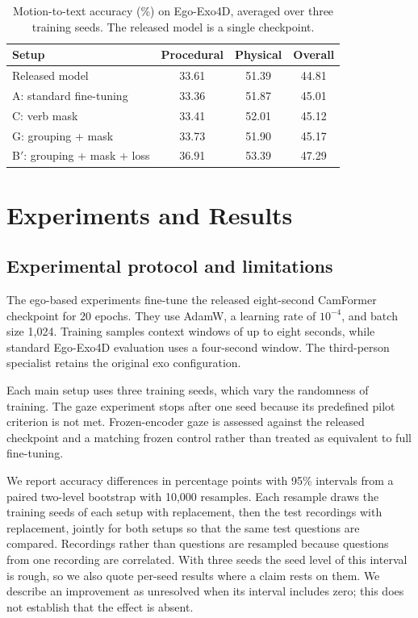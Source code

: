 \documentclass[10pt,twocolumn,letterpaper]{article}
\begin{document}
\begin{table}[t]
\centering\small
\setlength{\tabcolsep}{3pt}
\begin{tabular}{lccc}
\toprule
Setup & Procedural & Physical & Overall \\
\midrule
Released model & 33.61 & 51.39 & 44.81 \\
A: standard fine-tuning & 33.36 & 51.87 & 45.01 \\
C: verb mask & 33.41 & 52.01 & 45.12 \\
G: grouping + mask & 33.73 & 51.90 & 45.17 \\
B$'$: grouping + mask + loss & 36.91 & 53.39 & 47.29 \\
\bottomrule
\end{tabular}
\caption{Motion-to-text accuracy (\%) on Ego-Exo4D, averaged over three training seeds. The released model is a
single checkpoint.}
\label{tab:hn}
\end{table}

\section{Experiments and Results}
\label{sec:exp}

\subsection{Experimental protocol and limitations}
\label{sec:protocol}
The ego-based experiments fine-tune the released eight-second CamFormer checkpoint for 20 epochs. They use AdamW, a
learning rate of $10^{-4}$, and batch size 1,024. Training samples context windows of up to eight seconds, while
standard Ego-Exo4D evaluation uses a four-second window. The third-person specialist retains the original exo
configuration.

Each main setup uses three training seeds, which vary the randomness of training. The gaze experiment stops after
one seed because its predefined pilot criterion is not met. Frozen-encoder gaze is assessed against the released
checkpoint and a matching frozen control rather than treated as equivalent to full fine-tuning.

We report accuracy differences in percentage points with 95\% intervals from a paired two-level bootstrap with
10,000 resamples. Each resample draws the training seeds of each setup with replacement, then the test recordings
with replacement, jointly for both setups so that the same test questions are compared. Recordings rather than
questions are resampled because questions from one recording are correlated. With three seeds the seed level of
this interval is rough, so we also quote per-seed results where a claim rests on them. We describe an improvement
as unresolved when its interval includes zero; this does not establish that the effect is absent.
\end{document}
